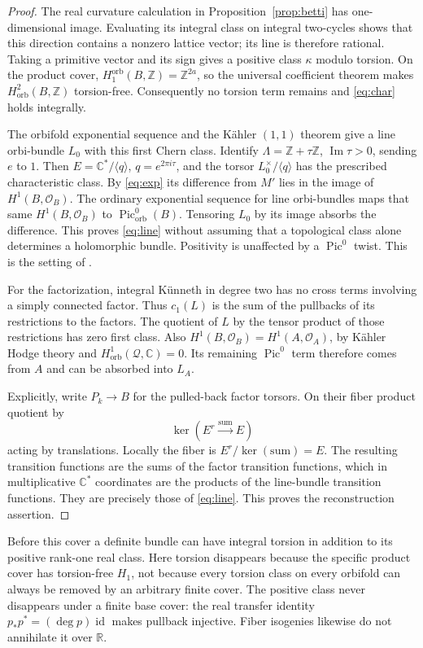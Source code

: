\documentclass[12pt]{amsart}
\theoremstyle{definition}
\theoremstyle{remark}
\numberwithin{equation}{section}
\newcommand{\cO}{\mathcal{O}}
\DeclareMathOperator{\id}{id}
\newcommand{\orb}{\mathrm{orb}}
\newcommand{\R}{\mathbb{R}}
\newcommand{\Z}{\mathbb{Z}}
\newcommand{\C}{\mathbb{C}}
\newcommand{\Pic}{\operatorname{Pic}}
\newcommand{\Qfac}{\mathcal{Q}}
\begin{document}
\begin{proof}
The real curvature calculation in Proposition~\ref{prop:betti} has
one-dimensional image. Evaluating its integral class on integral
two-cycles shows that this direction contains a nonzero lattice vector;
its line is therefore rational. Taking a primitive vector and its sign
gives a positive class $\kappa$ modulo torsion. On the product cover,
$H_1^{\orb}(B,\Z)=\Z^{2a}$, so the universal coefficient theorem
makes $H^2_{\orb}(B,\Z)$ torsion-free. Consequently no torsion term
remains and \eqref{eq:char} holds integrally.

The orbifold exponential sequence and the K\"ahler $(1,1)$ theorem
give a line orbi-bundle $L_0$ with this first Chern class. Identify
$\Lambda=\Z+\tau\Z$, $\operatorname{Im}\tau>0$, sending $e$ to $1$.
Then $E=\C^*/\langle q\rangle$, $q=e^{2\pi i\tau}$, and the torsor
$L_0^{\times}/\langle q\rangle$ has the prescribed characteristic
class. By \eqref{eq:exp} its difference from $M'$ lies in the image
of $H^1(B,\cO_B)$. The ordinary exponential sequence for line
orbi-bundles maps that same $H^1(B,\cO_B)$ to $\Pic^0_{\orb}(B)$.
Tensoring $L_0$ by its image absorbs the difference. This proves
\eqref{eq:line} without assuming that a topological class alone
determines a holomorphic bundle. Positivity is unaffected by a
$\Pic^0$ twist. This is the setting of \cite[Theorem 2.4]{Istrati}.

For the factorization, integral K\"unneth in degree two has no cross
terms involving a simply connected factor. Thus $c_1(L)$ is the sum
of the pullbacks of its restrictions to the factors. The quotient of
$L$ by the tensor product of those restrictions has zero first class.
Also $H^1(B,\cO_B)=H^1(A,\cO_A)$, by K\"ahler Hodge theory and
$H^1_{\orb}(\Qfac,\C)=0$. Its remaining $\Pic^0$ term therefore
comes from $A$ and can be absorbed into $L_A$.

Explicitly, write $P_k\to B$ for the pulled-back factor torsors.
On their fiber product quotient by
\[
\ker(E^r\xrightarrow{\mathrm{sum}}E)
\]
acting by translations. Locally the fiber is $E^r/\ker(\mathrm{sum})=E$.
The resulting transition functions are the sums of the factor transition
functions, which in multiplicative $\C^*$ coordinates are the products
of the line-bundle transition functions. They are precisely those of
\eqref{eq:line}. This proves the reconstruction assertion.
\end{proof}

Before this cover a definite bundle can have integral torsion in addition
to its positive rank-one real class. Here torsion disappears because
the specific product cover has torsion-free $H_1$, not because every
torsion class on every orbifold can always be removed by an arbitrary
finite cover. The positive class never disappears under a finite base
cover: the real transfer identity $p_*p^*=(\deg p)\id$ makes pullback
injective. Fiber isogenies likewise do not annihilate it over $\R$.
\end{document}
